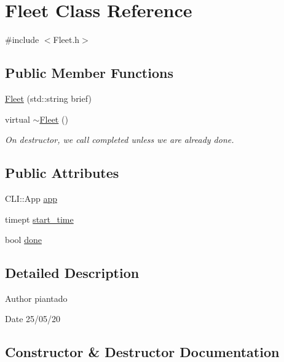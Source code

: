 \hypertarget{class_fleet}{}\section{Fleet Class Reference}
\label{class_fleet}


{\ttfamily \#include $<$Fleet.\+h$>$}

\subsection*{Public Member Functions}
\begin{DoxyCompactItemize}
\item 
\hyperlink{class_fleet_a53a96dbbec863eb807f8078e5dda4c6a}{Fleet} (std\+::string brief)
\item 
virtual \hyperlink{class_fleet_a16b92c30ec373acb143b8521f632ec3a}{$\sim$\+Fleet} ()
\begin{DoxyCompactList}\small\item\em On destructor, we call completed unless we are already done. \end{DoxyCompactList}\end{DoxyCompactItemize}
\subsection*{Public Attributes}
\begin{DoxyCompactItemize}
\item 
C\+L\+I\+::\+App \hyperlink{class_fleet_a6af91781ed20b1046e5e90042d6660a0}{app}
\item 
timept \hyperlink{class_fleet_a287f9cf06613b5ad1b511cc82216d42b}{start\+\_\+time}
\item 
bool \hyperlink{class_fleet_a58375961c9aa0b4249039b36fef7b20f}{done}
\end{DoxyCompactItemize}


\subsection{Detailed Description}
\begin{DoxyAuthor}{Author}
piantado 
\end{DoxyAuthor}
\begin{DoxyDate}{Date}
25/05/20 
\end{DoxyDate}


\subsection{Constructor \& Destructor Documentation}
\mbox{\label{class_fleet_a53a96dbbec863eb807f8078e5dda4c6a}} 
